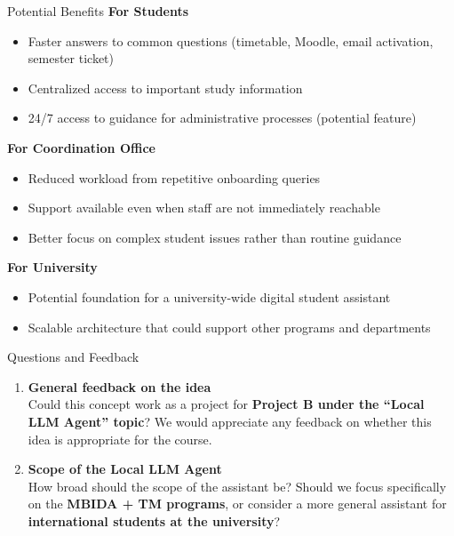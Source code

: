 \begin{frame}{Potential Benefits}
	\textbf{For Students}
	\begin{itemize}
		\item Faster answers to common questions (timetable, Moodle, email activation, semester ticket)
		\item Centralized access to important study information
		\item 24/7 access to guidance for administrative processes (potential feature)
	\end{itemize}

	\textbf{For Coordination Office}
	\begin{itemize}
		\item Reduced workload from repetitive onboarding queries
		\item Support available even when staff are not immediately reachable
		\item Better focus on complex student issues rather than routine guidance
	\end{itemize}

	\textbf{For University}
	\begin{itemize}
		\item Potential foundation for a university-wide digital student assistant
		\item Scalable architecture that could support other programs and departments
	\end{itemize}
\end{frame}


\begin{frame}{Questions and Feedback}
\begin{enumerate}
    \item \textbf{General feedback on the idea} \\
    Could this concept work as a project for \textbf{Project B under the “Local LLM Agent” topic}? 
    We would appreciate any feedback on whether this idea is appropriate for the course.

    \item \textbf{Scope of the Local LLM Agent} \\
    How broad should the scope of the assistant be? Should we focus specifically on the 
    \textbf{MBIDA + TM programs}, or consider a more general assistant for 
    \textbf{international students at the university}?
\end{enumerate}
\end{frame}

